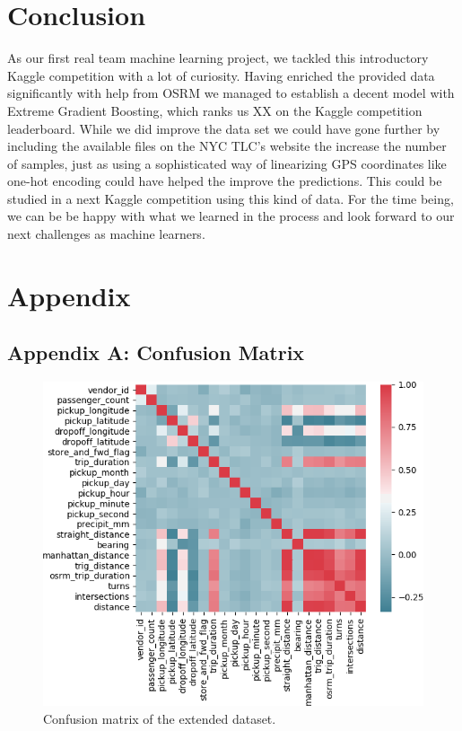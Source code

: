 \documentclass[a4paper]{article}
\begin{document}
\section{Conclusion}
As our first real team machine learning project, we tackled this introductory
Kaggle competition with a lot of curiosity. Having enriched the provided data
significantly with help from OSRM we managed to establish a decent model with
Extreme Gradient Boosting, which ranks us XX on the Kaggle competition
leaderboard. While we did improve the data set we could have gone further by
including the available files on the NYC TLC’s website the increase the number
of samples, just as using a sophisticated way of linearizing GPS coordinates
like one-hot encoding could have helped the improve the predictions. This could
be studied in a next Kaggle competition using this kind of data. For the time
being, we can be be happy with what we learned in the process and look forward
to our next challenges as machine learners.

\newpage
\footnotesize



\appendix
\newpage
\section{Appendix}
\subsection{Appendix A: Confusion Matrix}
\begin{figure}[h!]
    \centering
    \includegraphics[width=0.8\linewidth]{confusion}
    \caption{Confusion matrix of the extended dataset.}
    \label{confusion}
\end{figure}
\end{document}
